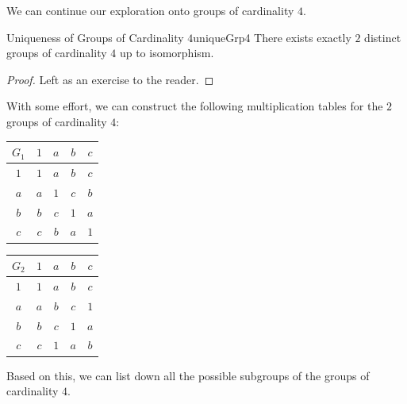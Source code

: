\documentclass[math]{amznotes}
\theoremstyle{remark}
\newcommand{\0}{\mathbf{0}}
\newcommand{\1}{\mathbf{1}}
\begin{document}
We can continue our exploration onto groups of cardinality $4$.
\begin{probox}{Uniqueness of Groups of Cardinality $4$}{uniqueGrp4}
    There exists exactly $2$ distinct groups of cardinality $4$ up to isomorphism.
    \tcblower
    \begin{proof}
        Left as an exercise to the reader.
    \end{proof}
\end{probox}
With some effort, we can construct the following multiplication tables for the $2$ groups of cardinality $4$:
\begin{center}
    \begin{tabular}{c|cccc}
        $G_1$ & $1$ & $a$ & $b$ & $c$ \\
        \hline
        $1$ & $1$ & $a$ & $b$ & $c$ \\
        $a$ & $a$ & $1$ & $c$ & $b$ \\
        $b$ & $b$ & $c$ & $1$ & $a$ \\
        $c$ & $c$ & $b$ & $a$ & $1$
    \end{tabular}\qquad
    \begin{tabular}{c|cccc}
        $G_2$ & $1$ & $a$ & $b$ & $c$ \\
        \hline
        $1$ & $1$ & $a$ & $b$ & $c$ \\
        $a$ & $a$ & $b$ & $c$ & $1$ \\
        $b$ & $b$ & $c$ & $1$ & $a$ \\
        $c$ & $c$ & $1$ & $a$ & $b$
    \end{tabular}
\end{center}
Based on this, we can list down all the possible subgroups of the groups of cardinality $4$.
\end{document}
